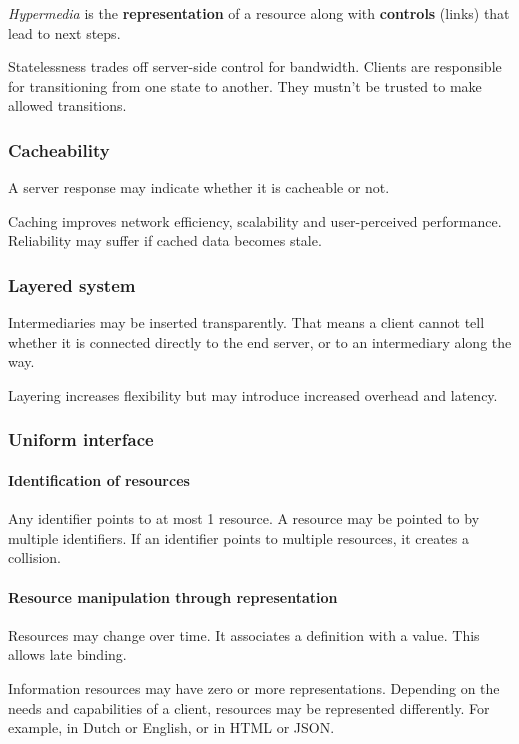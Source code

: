 \documentclass{report}
\begin{document}
\textit{Hypermedia} is the \textbf{representation} of a resource
along with \textbf{controls} (links) that lead to next steps.

Statelessness trades off server-side control for bandwidth.
Clients are responsible for transitioning from one state to another.
They mustn't be trusted to make allowed transitions.

\subsubsection{Cacheability}

A server response may indicate whether it is cacheable or not.

Caching improves network efficiency, scalability
and user-perceived performance.
Reliability may suffer if cached data becomes stale.

\subsubsection{Layered system}

Intermediaries may be inserted transparently.
That means a client cannot tell whether it is connected
directly to the end server, or to an intermediary along the way.

Layering increases flexibility
but may introduce increased overhead and latency.

\subsubsection{Uniform interface}

\paragraph{Identification of resources}

Any identifier points to at most 1 resource.
A resource may be pointed to by multiple identifiers.
If an identifier points to multiple resources,
it creates a collision.

\paragraph{Resource manipulation through representation}

Resources may change over time.
It associates a definition with a value.
This allows late binding.

Information resources may have zero or more representations.
Depending on the needs and capabilities of a client,
resources may be represented differently.
For example, in Dutch or English, or in HTML or JSON.
\end{document}
